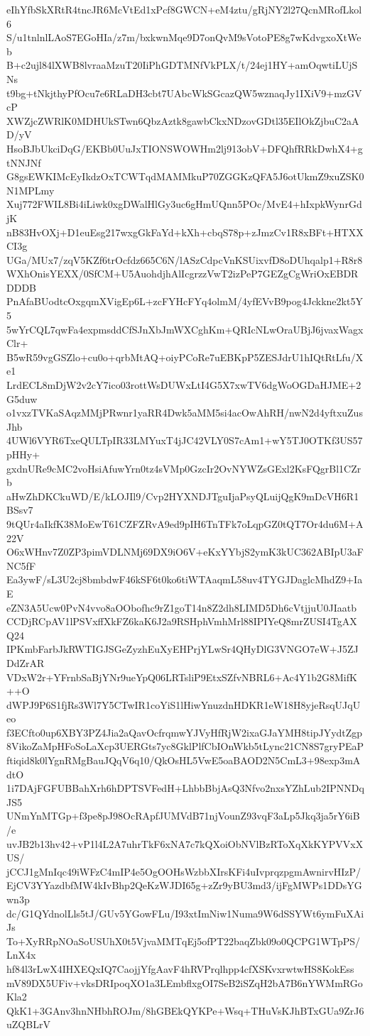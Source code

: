 eIhYfbSkXRtR4tncJR6McVtEd1xPcf8GWCN+eM4ztu/gRjNY2l27QcnMRofLkol6
S/u1tnlnlLAoS7EGoHIa/z7m/bxkwnMqe9D7onQvM9sVotoPE8g7wKdvgxoXtWeb
B+c2ujl84lXWB8lvraaMzuT20IiPhGDTMNfVkPLX/t/24ej1HY+amOqwtiLUjSNs
t9bg+tNkjthyPfOcu7e6RLaDH3cbt7UAbcWkSGcazQW5wznaqJy1IXiV9+mzGVcP
XWZjcZWRlK0MDHUkSTwn6QbzAztk8gawbCkxNDzovGDtl35EIlOkZjbuC2aAD/yV
HsoBJbUkciDqG/EKBb0UuJxTIONSWOWHm2lj913obV+DFQhfRRkDwhX4+gtNNJNf
G8gsEWKIMcEyIkdzOxTCWTqdMAMMkuP70ZGGKzQFA5J6otUkmZ9xuZSK0N1MPLmy
Xuj772FWIL8Bi4iLiwk0xgDWalHlGy3uc6gHmUQnn5POc/MvE4+hIxpkWynrGdjK
nB83HvOXj+D1euEsg217wxgGkFaYd+kXh+cbqS78p+zJmzCv1R8xBFt+HTXXCI3g
UGa/MUx7/zqV5KZf6trOcfdz665C6N/lASzCdpcVnKSUixvfD8oDUhqalp1+R8r8
WXhOnisYEXX/0SfCM+U5AuohdjhAlIcgrzzVwT2izPeP7GEZgCgWriOxEBDRDDDB
PnAfaBUodtcOxgqmXVigEp6L+zcFYHcFYq4olmM/4yfEVvB9pog4Jckkne2kt5Y5
5wYrCQL7qwFa4expmsddCfSJnXbJmWXCghKm+QRIcNLwOraUBjJ6jvaxWagxClr+
B5wR59vgGSZlo+cu0o+qrbMtAQ+oiyPCoRe7uEBKpP5ZESJdrU1hIQtRtLfu/Xe1
LrdECL8mDjW2v2cY7ico03rottWsDUWxLtI4G5X7xwTV6dgWoOGDaHJME+2G5duw
o1vxzTVKaSAqzMMjPRwnr1yaRR4Dwk5aMM5si4acOwAhRH/nwN2d4yftxuZusJhb
4UWl6VYR6TxeQULTpIR33LMYuxT4jJC42VLY0S7cAm1+wY5TJ0OTKf3US57pHHy+
gxdnURe9cMC2voHsiAfuwYrn0tz4sVMp0GzcIr2OvNYWZsGExl2KsFQgrBl1CZrb
aHwZhDKCkuWD/E/kLOJIl9/Cvp2HYXNDJTguIjaPsyQLuijQgK9mDcVH6R1BSsv7
9tQUr4aIkfK38MoEwT61CZFZRvA9ed9pIH6TnTFk7oLqpGZ0tQT7Or4du6M+A22V
O6xWHnv7Z0ZP3pimVDLNMj69DX9iO6V+eKxYYbjS2ymK3kUC362ABIpU3aFNC5fF
Ea3ywF/sL3U2cj8bmbdwF46kSF6t0ko6tiWTAaqmL58uv4TYGJDaglcMhdZ9+IaE
eZN3A5Ucw0PvN4vvo8aOObofhc9rZ1goT14n8Z2dh8LIMD5Dh6cVtjjuU0JIaatb
CCDjRCpAV1lPSVxffXkFZ6kaK6J2a9RSHphVmhMrl88IPIYeQ8mrZUSI4TgAXQ24
IPKmbFarbJkRWTIGJSGeZyzhEuXyEHPrjYLwSr4QHyDlG3VNGO7eW+J5ZJDdZrAR
VDxW2r+YFrnbSaBjYNr9ueYpQ06LRTsliP9EtxSZfvNBRL6+Ac4Y1b2G8MifK++O
dWPJ9P6S1fjRs3Wl7Y5CTwIR1coYiS1lHiwYnuzdnHDKR1eW18H8yjeRsqUJqUeo
f3ECfto0up6XBY3PZ4Jia2aQavOcfrqmwYJVyHfRjW2ixaGJaYMH8tipJYydtZgp
8VikoZaMpHFoSoLaXcp3UERGts7yc8GklPlfCbIOnWkb5tLync21CN8S7gryPEaP
ftiqid8k0lYgnRMgBauJQqV6q10/QkOsHL5VwE5oaBAOD2N5CmL3+98exp3mAdtO
1i7DAjFGFUBBahXrh6hDPTSVFedH+LhbbBbjAsQ3Nfvo2nxsYZhLub2IPNNDqJS5
UNmYnMTGp+f3pe8pJ98OcRApfJUMVdB71njVounZ93vqF3aLp5Jkq3ja5rY6iB/e
uvJB2b13hv42+vP1l4L2A7uhrTkF6xNA7c7kQXoiObNVlBzRToXqXkKYPVVxXUS/
jCCJ1gMnIqc49iWFzC4mIP4e5OgOOHsWzbbXIrsKFi4uIvprqzpgmAwnirvHIzP/
EjCV3YYazdbfMW4kIvBhp2QeKzWJDI65g+zZr9yBU3md3/ijFgMWPs1DDsYGwn3p
dc/G1QYdnolLls5tJ/GUv5YGowFLu/I93xtImNiw1Numa9W6dSSYWt6ymFuXAiJs
To+XyRRpNOaSoUSUhX0t5VjvaMMTqEj5ofPT22baqZbk09o0QCPG1WTpPS/LnX4x
hf84l3rLwX4IHXEQxIQ7CaojjYfgAavF4hRVPrqlhpp4cfXSKvxrwtwHS8KokEss
mV89DX5UFiv+vksDRIpoqXO1a3LEmbflxgOI7SeB2iSZqH2bA7B6nYWMmRGoKla2
QkK1+3GAnv3hnNHbhROJm/8hGBEkQYKPe+Wsq+THuVsKJhBTxGUa9ZrJ6uZQBLrV
